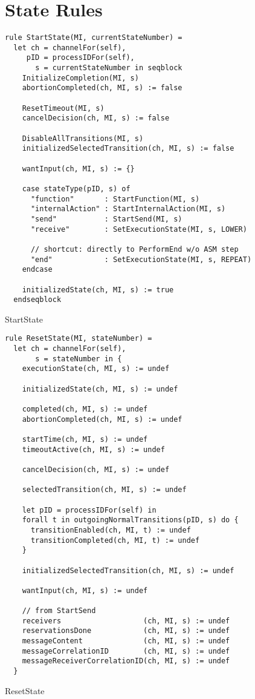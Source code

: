 \section{State Rules}

\begin{listing}[H]
\begin{verbatim}
rule StartState(MI, currentStateNumber) =
  let ch = channelFor(self),
     pID = processIDFor(self),
       s = currentStateNumber in seqblock
    InitializeCompletion(MI, s)
    abortionCompleted(ch, MI, s) := false

    ResetTimeout(MI, s)
    cancelDecision(ch, MI, s) := false

    DisableAllTransitions(MI, s)
    initializedSelectedTransition(ch, MI, s) := false

    wantInput(ch, MI, s) := {}

    case stateType(pID, s) of
      "function"       : StartFunction(MI, s)
      "internalAction" : StartInternalAction(MI, s)
      "send"           : StartSend(MI, s)
      "receive"        : SetExecutionState(MI, s, LOWER)

      // shortcut: directly to PerformEnd w/o ASM step
      "end"            : SetExecutionState(MI, s, REPEAT)
    endcase

    initializedState(ch, MI, s) := true
  endseqblock
\end{verbatim}
\caption{StartState}
\label{lst:asm:StartState}
\end{listing}




\begin{listing}[H]
\begin{verbatim}
rule ResetState(MI, stateNumber) =
  let ch = channelFor(self),
       s = stateNumber in {
    executionState(ch, MI, s) := undef

    initializedState(ch, MI, s) := undef

    completed(ch, MI, s) := undef
    abortionCompleted(ch, MI, s) := undef

    startTime(ch, MI, s) := undef
    timeoutActive(ch, MI, s) := undef

    cancelDecision(ch, MI, s) := undef

    selectedTransition(ch, MI, s) := undef

    let pID = processIDFor(self) in
    forall t in outgoingNormalTransitions(pID, s) do {
      transitionEnabled(ch, MI, t) := undef
      transitionCompleted(ch, MI, t) := undef
    }

    initializedSelectedTransition(ch, MI, s) := undef

    wantInput(ch, MI, s) := undef

    // from StartSend
    receivers                   (ch, MI, s) := undef
    reservationsDone            (ch, MI, s) := undef
    messageContent              (ch, MI, s) := undef
    messageCorrelationID        (ch, MI, s) := undef
    messageReceiverCorrelationID(ch, MI, s) := undef
  }
\end{verbatim}
\caption{ResetState}
\label{lst:asm:ResetState}
\end{listing}





